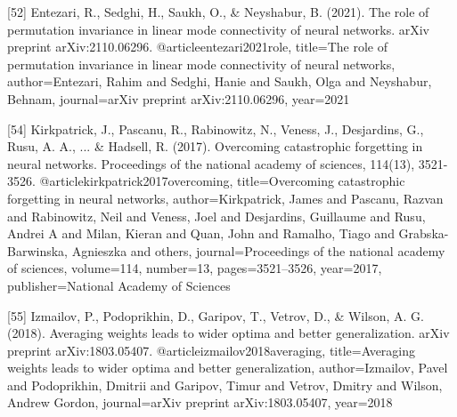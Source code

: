 \documentclass{article}
\begin{document}
{[52] Entezari, R., Sedghi, H., Saukh, O., & Neyshabur, B. (2021). The role of permutation invariance in linear mode connectivity of neural networks. arXiv preprint arXiv:2110.06296.
@article{entezari2021role,
  title={The role of permutation invariance in linear mode connectivity of neural networks},
  author={Entezari, Rahim and Sedghi, Hanie and Saukh, Olga and Neyshabur, Behnam},
  journal={arXiv preprint arXiv:2110.06296},
  year={2021}
}

[54] Kirkpatrick, J., Pascanu, R., Rabinowitz, N., Veness, J., Desjardins, G., Rusu, A. A., ... & Hadsell, R. (2017). Overcoming catastrophic forgetting in neural networks. Proceedings of the national academy of sciences, 114(13), 3521-3526.
@article{kirkpatrick2017overcoming,
  title={Overcoming catastrophic forgetting in neural networks},
  author={Kirkpatrick, James and Pascanu, Razvan and Rabinowitz, Neil and Veness, Joel and Desjardins, Guillaume and Rusu, Andrei A and Milan, Kieran and Quan, John and Ramalho, Tiago and Grabska-Barwinska, Agnieszka and others},
  journal={Proceedings of the national academy of sciences},
  volume={114},
  number={13},
  pages={3521--3526},
  year={2017},
  publisher={National Academy of Sciences}
}

[55] Izmailov, P., Podoprikhin, D., Garipov, T., Vetrov, D., & Wilson, A. G. (2018). Averaging weights leads to wider optima and better generalization. arXiv preprint arXiv:1803.05407.
@article{izmailov2018averaging,
  title={Averaging weights leads to wider optima and better generalization},
  author={Izmailov, Pavel and Podoprikhin, Dmitrii and Garipov, Timur and Vetrov, Dmitry and Wilson, Andrew Gordon},
  journal={arXiv preprint arXiv:1803.05407},
  year={2018}
}



}
\end{document}
